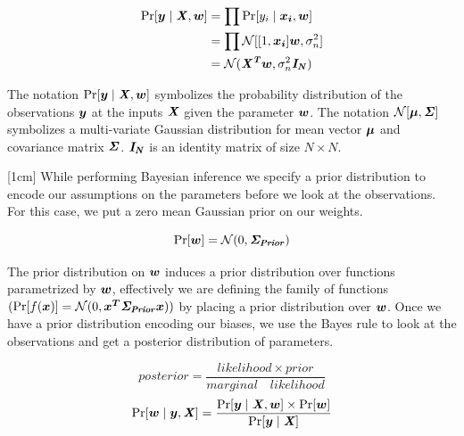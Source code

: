 \begin{equation}\label{eqBayesianLikelihood}
\begin{aligned}
\Pr[\boldsymbol{y} \mid \bm{\mathit{X}}, \boldsymbol{w}]  & = \prod \Pr[y_{i} \mid \boldsymbol{x_{i}}, \boldsymbol{w}]\\
                & = \prod \mathcal{N}[[1, \boldsymbol{x_{i}}]\boldsymbol{w} , \sigma_{n}^{2}]\\
                & = \mathcal{N}(\bm{\mathit{X^{T}}} \boldsymbol{w}, \sigma_{n}^{2}\bm{\mathit{I_N}})    
\end{aligned}
\end{equation}

The notation $\Pr[\boldsymbol{y} \mid \bm{\mathit{X}}, \boldsymbol{w}]$ symbolizes the probability distribution of the observations $\boldsymbol{y}$ at the inputs $\bm{\mathit{X}}$ given the parameter $\boldsymbol{w}$. The notation $\mathcal{N}[\boldsymbol{\mu} , \bm{\mathit{\Sigma}}]$ symbolizes a multi-variate Gaussian distribution for mean vector $\boldsymbol{\mu}$ and covariance matrix $\bm{\mathit{\Sigma}}$. $\bm{\mathit{I_N}}$ is an identity matrix of size $N \times N$.

[1cm]
While performing Bayesian inference we specify a prior distribution to encode our assumptions on the parameters before we look at the observations. For this case, we put a zero mean Gaussian prior on our weights.

\begin{equation}\label{eqBayesianPrior}
\Pr[\boldsymbol{w}] = \mathcal{N}(0, \bm{\mathit{\Sigma_{Prior}}})
\end{equation}

The prior distribution on $\boldsymbol{w}$ induces a prior distribution over functions parametrized by $\boldsymbol{w}$, effectively we are defining the family of functions $(\Pr[f(\boldsymbol{x})] = \mathcal{N}(0, \boldsymbol{x^{T}}\bm{\mathit{\Sigma_{Prior}}}\boldsymbol{x}))$ by placing a prior distribution over $\boldsymbol{w}$. Once we have a prior distribution encoding our biases, we use the Bayes rule to look at the observations and get a posterior distribution of parameters.

\begin{equation*}
posterior = \frac{likelihood \times prior}{marginal \quad likelihood}
\end{equation*}
\begin{equation}\label{eqBayesRule}
\Pr[\boldsymbol{w} \mid \boldsymbol{y}, \bm{\mathit{X}}] = \frac{\Pr[\boldsymbol{y} \mid \bm{\mathit{X}}, \boldsymbol{w}] \times \Pr[\boldsymbol{w}]}{\Pr[\boldsymbol{y} \mid \bm{\mathit{X}}]}
\end{equation}

